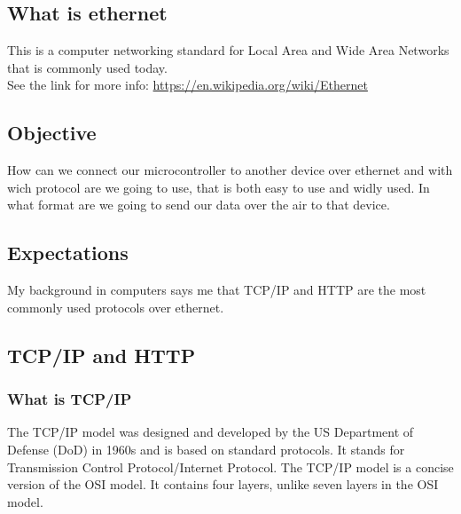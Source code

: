 \documentclass[a4paper,twoside, 12pt]{report}
\theoremstyle{break}
\begin{document}
\subsection{What is ethernet}
This is a computer networking standard for Local Area and Wide Area Networks that is commonly used today.\\
See the link for more info:
\url{https://en.wikipedia.org/wiki/Ethernet}

\subsection{Objective}
How can we connect our microcontroller to another device over ethernet and with wich protocol are we going to use, that is both easy to use and widly used. In what format are we going to send our data over the air to that device.

\subsection{Expectations}
My background in computers says me that TCP/IP and HTTP are the most commonly used protocols over ethernet.

\subsection{TCP/IP and HTTP}
\subsubsection{What is TCP/IP}

The TCP/IP model was designed and developed by the US Department of Defense (DoD) in 1960s and is based on standard protocols. It stands for Transmission Control Protocol/Internet Protocol. The TCP/IP model is a concise version of the OSI model. It contains four layers, unlike seven layers in the OSI model.
\end{document}
